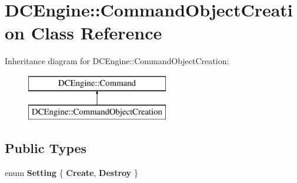 \hypertarget{classDCEngine_1_1CommandObjectCreation}{\section{D\-C\-Engine\-:\-:Command\-Object\-Creation Class Reference}
\label{classDCEngine_1_1CommandObjectCreation}
}
Inheritance diagram for D\-C\-Engine\-:\-:Command\-Object\-Creation\-:\begin{figure}[H]
\begin{center}
\leavevmode
\includegraphics[height=2.000000cm]{classDCEngine_1_1CommandObjectCreation}
\end{center}
\end{figure}
\subsection*{Public Types}
\begin{DoxyCompactItemize}
\item 
enum {\bfseries Setting} \{ {\bfseries Create}, 
{\bfseries Destroy}
 \}
\end{DoxyCompactItemize}
